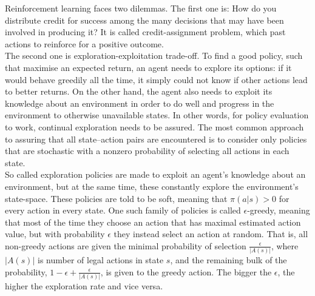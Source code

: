 Reinforcement learning faces two dilemmas. The first one is: How do you distribute credit for success among the many decisions that may have been involved in producing it? It is called credit-assignment problem, which past actions to reinforce for a positive outcome. \\
The second one is exploration-exploitation trade-off. To find a good policy, such that maximise an expected return, an agent needs to explore its options: if it would behave greedily all the time, it simply could not know if other actions lead to better returns. On the other hand, the agent also needs to exploit its knowledge about an environment in order to do well and progress in the environment to otherwise unavailable states. In other words, for policy evaluation to work, continual exploration needs to be assured. The most common approach to assuring that all state–action pairs are encountered is to consider only policies that are stochastic with a nonzero probability of selecting all actions in each state. \\
So called exploration policies are made to exploit an agent's knowledge about an environment, but at the same time, these constantly explore the environment's state-space. These policies are told to be soft, meaning that $\pi(a|s) > 0$ for every action in every state. One such family of policies is called $\epsilon$-greedy, meaning that most of the time they choose an action that has maximal estimated action value, but with probability $\epsilon$ they instead select an action at random. That is, all non-greedy actions are given the minimal probability of selection $\frac{\epsilon}{|A(s)|}$, where $|A(s)|$ is number of legal actions in state $s$, and the remaining bulk of the probability, $1 - \epsilon + \frac{\epsilon}{|A(s)|}$, is given to the greedy action. The bigger the $\epsilon$, the higher the exploration rate and vice versa.

